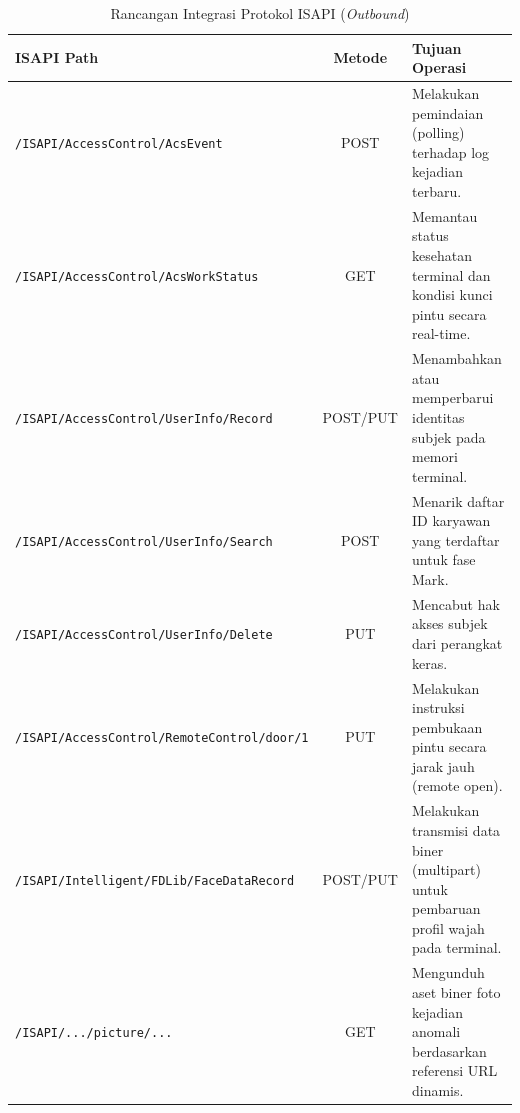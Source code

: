 \begin{table}[htbp]
    \centering
    \caption{Rancangan Integrasi Protokol ISAPI (\textit{Outbound})}
    \label{tab:api_isapi}
    \small
    \begin{tabularx}{\textwidth}{|>{\raggedright\arraybackslash}p{6cm}|c|X|}
        \hline
        \textbf{ISAPI Path} & \textbf{Metode} & \textbf{Tujuan Operasi} \\
        \hline
        \texttt{/ISAPI/\allowbreak AccessControl/\allowbreak AcsEvent} & POST & Melakukan pemindaian (polling) terhadap log kejadian terbaru. \\
        \hline
        \texttt{/ISAPI/\allowbreak AccessControl/\allowbreak AcsWorkStatus} & GET & Memantau status kesehatan terminal dan kondisi kunci pintu secara real-time. \\
        \hline
        \texttt{/ISAPI/\allowbreak AccessControl/\allowbreak UserInfo/\allowbreak Record} & POST/PUT & Menambahkan atau memperbarui identitas subjek pada memori terminal. \\
        \hline
        \texttt{/ISAPI/\allowbreak AccessControl/\allowbreak UserInfo/\allowbreak Search} & POST & Menarik daftar ID karyawan yang terdaftar untuk fase Mark. \\
        \hline
        \texttt{/ISAPI/\allowbreak AccessControl/\allowbreak UserInfo/\allowbreak Delete} & PUT & Mencabut hak akses subjek dari perangkat keras. \\
        \hline
        \texttt{/ISAPI/\allowbreak AccessControl/\allowbreak RemoteControl/\allowbreak door/1} & PUT & Melakukan instruksi pembukaan pintu secara jarak jauh (remote open). \\
        \hline
        \texttt{/ISAPI/\allowbreak Intelligent/\allowbreak FDLib/\allowbreak FaceDataRecord} & POST/PUT & Melakukan transmisi data biner (multipart) untuk pembaruan profil wajah pada terminal. \\
        \hline
        \texttt{/ISAPI/\allowbreak .../\allowbreak picture/\allowbreak ...} & GET & Mengunduh aset biner foto kejadian anomali berdasarkan referensi URL dinamis. \\
        \hline
    \end{tabularx}
\end{table}